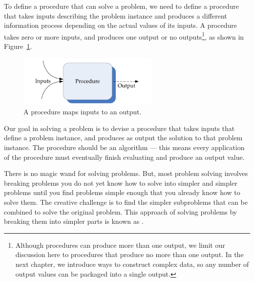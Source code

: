 \begin{schemeregion}
To define a procedure that can solve a problem, we need to define a procedure that takes inputs describing the problem instance and produces a different information process depending on the actual values of its inputs.  A procedure takes zero or more inputs, and produces one output or no outputs\footnote{Although procedures can produce more than one output, we limit our discussion here to procedures that produce no more than one output.  In the next chapter, we introduce ways to construct complex data, so any number of output values can be packaged into a single output.}, as shown in Figure~\ref{fig:procedure}.

\begin{figure}[!ht]
\begin{center}
\includegraphics[height=1.0in]{figures/procedure.pdf}
\caption{A procedure maps inputs to an output.\label{fig:procedure}}
\end{center}
\end{figure}

Our goal in solving a problem is to devise a procedure that takes inputs that define a problem instance, and produces as output the solution to that problem instance.  The procedure should be an algorithm --- this means every application of the procedure must eventually finish evaluating and produce an output value.  


There is no magic wand for solving problems.  But, most problem solving involves breaking problems you do not yet know how to solve into simpler and simpler problems until you find problems simple enough that you already know how to solve them.  The creative challenge is to find the simpler subproblems that can be combined to solve the original problem.  This approach of solving problems by breaking them into simpler parts is known as .


\end{schemeregion}
